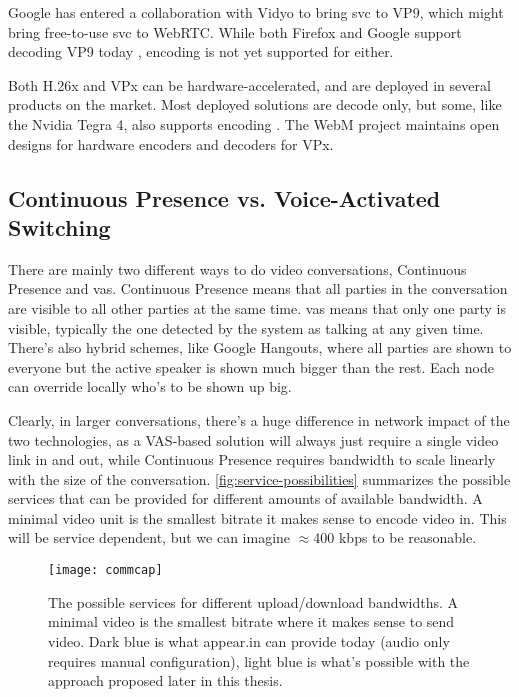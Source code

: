 Google has entered a collaboration with Vidyo \cite{vp9-vidyo} to bring \gls{svc} to VP9, which might bring free-to-use \gls{svc} to WebRTC. While both Firefox and Google support decoding VP9 today \cite{vp9-support}, encoding is not yet supported for either.

Both H.26x and VPx can be hardware-accelerated, and are deployed in several products on the market. Most deployed solutions are decode only, but some, like the Nvidia Tegra 4, also supports encoding \cite{nvidia-hw-encode}. The WebM project maintains open designs for hardware encoders and decoders for VPx.


\subsection{Continuous Presence vs. Voice-Activated Switching}

There are mainly two different ways to do video conversations, Continuous Presence and \acrfull{vas}. Continuous Presence means that all parties in the conversation are visible to all other parties at the same time. \gls{vas} means that only one party is visible, typically the one detected by the system as talking at any given time. There's also hybrid schemes, like Google Hangouts, where all parties are shown to everyone but the active speaker is shown much bigger than the rest. Each node can override locally who's to be shown up big.

Clearly, in larger conversations, there's a huge difference in network impact of the two technologies, as a VAS-based solution will always just require a single video link in and out, while Continuous Presence requires bandwidth to scale linearly with the size of the conversation. \autoref{fig:service-possibilities} summarizes the possible services that can be provided for different amounts of available bandwidth. A minimal video unit is the smallest bitrate it makes sense to encode video in. This will be service dependent, but we can imagine $\approx$400 kbps to be reasonable.

\begin{figure}
    \centering
    \texttt{[image: commcap]}
    \caption{The possible services for different upload/download bandwidths. A minimal video is the smallest bitrate where it makes sense to send video. Dark blue is what appear.in can provide today (audio only requires manual configuration), light blue is what's possible with the approach proposed later in this thesis.}
    \label{fig:service-possibilities}
\end{figure}

